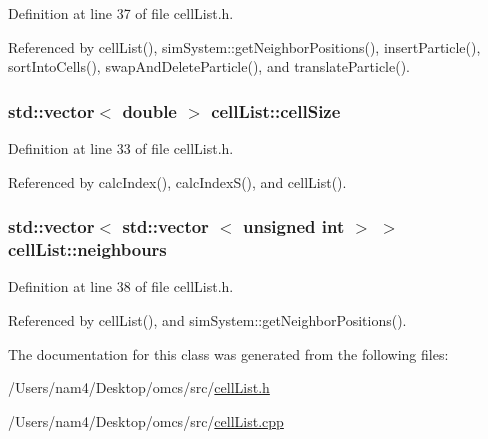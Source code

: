Definition at line 37 of file cell\+List.\+h.



Referenced by cell\+List(), sim\+System\+::get\+Neighbor\+Positions(), insert\+Particle(), sort\+Into\+Cells(), swap\+And\+Delete\+Particle(), and translate\+Particle().

\hypertarget{classcell_list_ac920f36bcf43f79ab853921bb0b7c2f4}{}
\subsubsection[{cell\+Size}]{\setlength{\rightskip}{0pt plus 5cm}std\+::vector$<$ double $>$ cell\+List\+::cell\+Size}\label{classcell_list_ac920f36bcf43f79ab853921bb0b7c2f4}


Definition at line 33 of file cell\+List.\+h.



Referenced by calc\+Index(), calc\+Index\+S(), and cell\+List().

\hypertarget{classcell_list_ada607886d0e5a20d710dde694d6d989f}{}
\subsubsection[{neighbours}]{\setlength{\rightskip}{0pt plus 5cm}std\+::vector$<$ std\+::vector $<$ unsigned int $>$ $>$ cell\+List\+::neighbours}\label{classcell_list_ada607886d0e5a20d710dde694d6d989f}


Definition at line 38 of file cell\+List.\+h.



Referenced by cell\+List(), and sim\+System\+::get\+Neighbor\+Positions().



The documentation for this class was generated from the following files\+:\begin{DoxyCompactItemize}
\item 
/\+Users/nam4/\+Desktop/omcs/src/\hyperlink{cell_list_8h}{cell\+List.\+h}\item 
/\+Users/nam4/\+Desktop/omcs/src/\hyperlink{cell_list_8cpp}{cell\+List.\+cpp}\end{DoxyCompactItemize}
